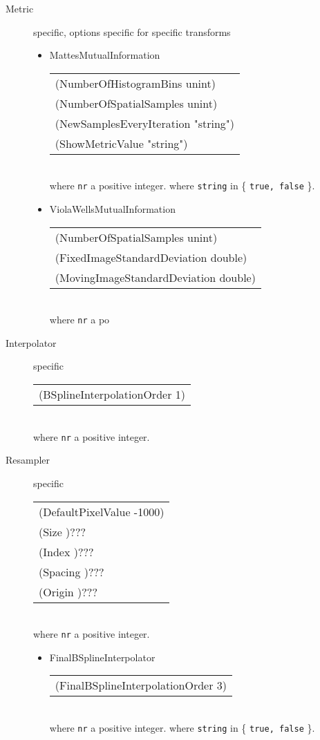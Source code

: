 \documentclass[a4paper]{article}
\newenvironment{Tabular}[1]{\ttfamily \begin{tabular}{#1}}{\end{tabular}}
\begin{document}
\begin{description}
\item[Metric] specific, options specific for specific transforms\\
    \begin{itemize}
    \item MattesMutualInformation\\
        \begin{Tabular}{l}
        (NumberOfHistogramBins unint) \\
        (NumberOfSpatialSamples unint) \\
        (NewSamplesEveryIteration "string") \\
        (ShowMetricValue "string")
        \end{Tabular}\\
    where \texttt{nr} a positive integer. where \texttt{string} in \{ \texttt{true, false} \}.
    \item ViolaWellsMutualInformation\\
        \begin{Tabular}{l}
        (NumberOfSpatialSamples unint) \\
        (FixedImageStandardDeviation double) \\
        (MovingImageStandardDeviation double)
        \end{Tabular}\\
    where \texttt{nr} a po
    \end{itemize}

\item[Interpolator] specific\\
    \begin{Tabular}{l}
    (BSplineInterpolationOrder 1)
    \end{Tabular}\\
where \texttt{nr} a positive integer.

\item[Resampler] specific\\
    \begin{Tabular}{l}
    (DefaultPixelValue -1000) \\
    (Size )??? \\
    (Index )??? \\
    (Spacing )??? \\
    (Origin )??? \\
    \end{Tabular}\\
where \texttt{nr} a positive integer.
    \begin{itemize}
    \item FinalBSplineInterpolator\\
        \begin{Tabular}{l}
        (FinalBSplineInterpolationOrder 3) \\
        \end{Tabular}\\
    where \texttt{nr} a positive integer. where \texttt{string} in \{ \texttt{true, false} \}.
    \end{itemize}

\end{description}
\end{document}
